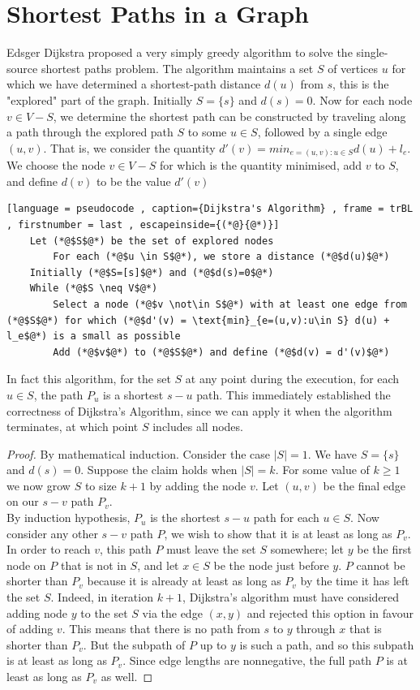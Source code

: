 \documentclass[a4paper]{article}
\theoremstyle{plain}
\theoremstyle{definition}
\theoremstyle{remark}
\begin{document}
	\section{Shortest Paths in a Graph}
	Edsger Dijkstra proposed a very simply greedy algorithm to solve the single-source shortest paths problem. The algorithm maintains a set $S$ of vertices $u$ for which we have determined a shortest-path distance $d(u)$ from $s $, this is the "explored" part of the graph. Initially $S = \{s\}$ and $d(s) = 0$. Now for each node $v \in V - S$, we determine the shortest path can be constructed by traveling along a path through the explored path $S$ to some $u \in S$, followed by a single edge $(u,v)$. That is, we consider the quantity $d'(v) = min_{e=(u,v):u\in S}d(u)+l_e$. We choose the node $v \in V-S$ for which is the quantity minimised, add $v$ to $S$, and define $d(v)$ to be the value $d'(v)$
	\begin{lstlisting}[language = pseudocode , caption={Dijkstra's Algorithm} , frame = trBL , firstnumber = last , escapeinside={(*@}{@*)}]
	Let (*@$S$@*) be the set of explored nodes
		For each (*@$u \in S$@*), we store a distance (*@$d(u)$@*)
	Initially (*@$S=[s]$@*) and (*@$d(s)=0$@*)
	While (*@$S \neq V$@*)
		Select a node (*@$v \not\in S$@*) with at least one edge from (*@$S$@*)	for which (*@$d'(v) = \text{min}_{e=(u,v):u\in S} d(u) + l_e$@*) is a small as possible
		Add (*@$v$@*) to (*@$S$@*) and define (*@$d(v) = d'(v)$@*)
	\end{lstlisting}
	In fact this algorithm, for the set $S$ at any point during the execution, for each $u \in S$, the path $P_u$ is a shortest $s-u$ path. This immediately established the correctness of Dijkstra's Algorithm, since we can apply it when the algorithm terminates, at which point $S$ includes all nodes.
	\begin{proof}
		By mathematical induction. Consider the case $|S| = 1$. We have $S = \{s\}$ and $d(s) = 0$. Suppose the claim holds when  $|S| = k$. For some value of $k\ge 1$ we now grow $S$ to size $k+1$ by adding the node $v$. Let $(u,v)$ be the final edge on our $s-v$ path $P_v$. \\
		By induction hypothesis, $P_u$ is the shortest $s-u$ path for each $u \in S$. Now consider any other $s-v$ path $P$, we wish to show that it is at least as long as $P_v$. In order to reach $v$, this path $P$ must leave the set $S$ somewhere; let $y$ be the first node on $P$ that is not in $S$, and let $x \in S$ be the node just before $y$. $P$ cannot be shorter than $P_v$ because it is already at least as long as $P_v$ by the time it has left the set $S$. Indeed, in iteration $k+1$, Dijkstra's algorithm must have considered adding node $y$ to the set $S$ via the edge $(x,y)$ and rejected this option in favour of adding $v$. This means that there is no path from $s$ to $y$ through $x$ that is shorter than $P_v$. But the subpath of $P$ up to $y$ is such a path, and so this subpath is at least as long as $P_v$. Since edge lengths are nonnegative, the full path $P$ is at least as long as $P_v$ as well.
	\end{proof}
\end{document}
